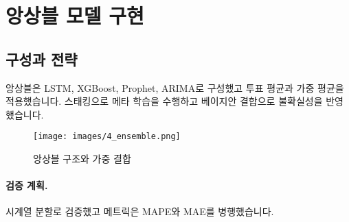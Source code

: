 \section{앙상블 모델 구현}

\subsection{구성과 전략}
앙상블은 LSTM, XGBoost, Prophet, ARIMA로 구성했고 투표 평균과 가중 평균을 적용했습니다. 스태킹으로 메타 학습을 수행하고 베이지안 결합으로 불확실성을 반영했습니다.

\begin{figure}[H]
    \centering
    \texttt{[image: images/4\_ensemble.png]}
    \caption{앙상블 구조와 가중 결합}
    \label{fig:ensemble}
\end{figure}

\paragraph{검증 계획.} 시계열 분할로 검증했고 메트릭은 MAPE와 MAE를 병행했습니다.

